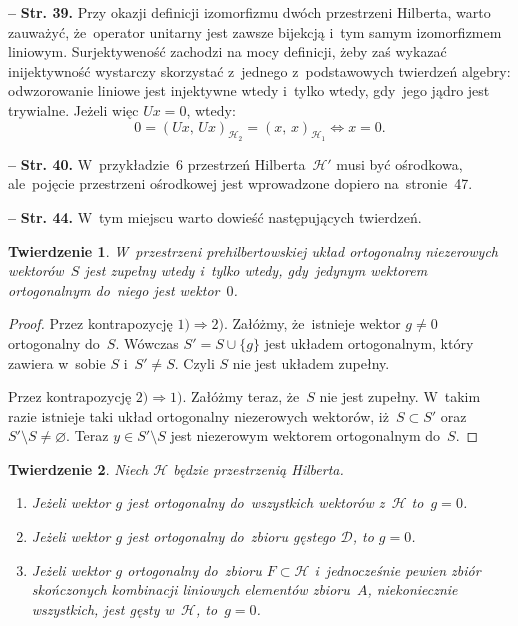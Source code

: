 \documentclass[a4paper,11pt]{article}
\newtheorem{twr}{Twierdzenie}
\newcommand{\spaceFour}{0.5em}
\let\emptyset\varnothing
\newcommand{\mc}{\mathcal}
\newcommand{\Ra}{\Rightarrow}
\newcommand{\wtw}{wtedy i~tylko wtedy}
\newcommand{\Dc}{\mc{D}}
\newcommand{\Hc}{\mc{H}}
\newcommand{\set}[1]{\{ #1 \}}
\newcommand{\es}{\emptyset}
\newcommand{\subs}{\subset}
\newcommand{\setm}{\setminus}
\newcommand{\tb}{\textbf}
\newcommand{\noi}{\noindent}
\newcommand{\start}{\noi \tb{--} {}}
\newcommand{\Str}[1]{\tb{Str. #1.}}
\newcommand{\SP}[2]{( #1, \, #2 )} %
\begin{document}
\vspace{\spaceFour}


\start \Str{39} Przy okazji definicji izomorfizmu dwóch przestrzeni
Hilberta, warto zauważyć, że~operator unitarny jest zawsze bijekcją
i~tym samym izomorfizmem liniowym. Surjektyweność zachodzi na mocy
definicji, żeby zaś wykazać inijektywność wystarczy skorzystać
z~jednego z~podstawowych twierdzeń algebry: odwzorowanie liniowe jest
injektywne \wtw, gdy~jego jądro jest trywialne. Jeżeli więc $Ux = 0$,
wtedy:
\begin{equation*}
  0 = \SP{ Ux }{ Ux }_{ \Hc_{ 2 } } = \SP{ x }{ x }_{ \Hc_{ 1 } } \iff x = 0.
\end{equation*}

\vspace{\spaceFour}


\start \Str{40} W~przykładzie~6 przestrzeń Hilberta~$\Hc'$ musi być
ośrodkowa, ale~pojęcie przestrzeni ośrodkowej jest wprowadzone dopiero
na~stronie~47. %

\vspace{\spaceFour}


\start \Str{44} W~tym miejscu warto dowieść następujących twierdzeń.
\begin{twr}
  \label{twr:UkladZupelny}
  W~przestrzeni prehilbertowskiej układ ortogonalny niezerowych
  wektorów~$S$ jest zupełny \wtw, gdy~jedynym wektorem ortogonalnym
  do~niego jest wektor~$0$.
\end{twr}

\begin{proof}
  Przez kontrapozycję $1) \Ra 2)$. Załóżmy, że~istnieje wektor
  $g \neq 0$ ortogonalny do~$S$. Wówczas $S' = S \cup \set{ g }$ jest
  układem ortogonalnym, który zawiera w~sobie $S$ i~$S' \neq S$. Czyli
  $S$ nie jest układem zupełny.

  Przez kontrapozycję $2) \Ra 1)$. Załóżmy teraz, że~$S$ nie jest
  zupełny. W~takim razie istnieje taki układ ortogonalny niezerowych
  wektorów, iż~$S \subs S'$ oraz $S' \setm S \neq \es$. Teraz
  $y \in S' \setm S$ jest niezerowym wektorem ortogonalnym do~$S$.
\end{proof}

\begin{twr}
  \label{twr:OrotgonalnoscDoZbioruGestegoIBazy}
  Niech $\Hc$ będzie przestrzenią Hilberta.
  \begin{enumerate}
  \item Jeżeli wektor $g$ jest ortogonalny do~wszystkich wektorów
    z~$\Hc$ to~$g = 0$.
  \item Jeżeli wektor $g$ jest ortogonalny do~zbioru gęstego $\Dc$, to
    $g = 0$.
  \item Jeżeli wektor $g$ ortogonalny do~zbioru $F \subs \Hc$
    i~jednocześnie pewien zbiór skończonych kombinacji liniowych
    elementów zbioru~$A$, niekoniecznie wszystkich, jest gęsty
    w~$\Hc$, to~$g = 0$.
  \end{enumerate}
\end{twr}
\end{document}

